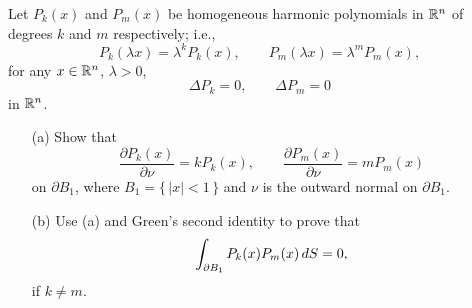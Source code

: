 \begin{problem}
  Let \(P_k(x)\) and \(P_m(x)\) be homogeneous harmonic polynomials in
  \(\mathbb{R}^n\) of degrees \(k\) and \(m\) respectively; i.e.,
  \[
    P_k(\lambda x)=\lambda^kP_k(x),\qquad P_m(\lambda x)=\lambda^mP_m(x),
  \]
  for any \(x\in\mathbb{R}^n\), \(\lambda>0\),
  \[
    \Delta P_k=0,\qquad\Delta P_m=0
  \]
  in \(\mathbb{R}^n\).
  \begin{itemize}[noitemsep]
  \item[(a)] Show that
    \[
      \frac{\partial P_k(x)}{\partial\nu}=kP_k(x),\qquad
      \frac{\partial P_m(x)}{\partial \nu}=mP_m(x)
    \]
    on \(\partial B_1\), where \(B_1=\{\,|x|<1\,\}\) and \(\nu\) is the
    outward normal on \(\partial B_1\).
  \item[(b)] Use (a) and Green's second identity to prove that
    \[
      \int_{\partial B_1} P_k(x)P_m(x)\mathop{}\!d S=0,
    \]
    if \(k\neq m\).
  \end{itemize}
\end{problem}
\begin{solution}
\end{solution}

